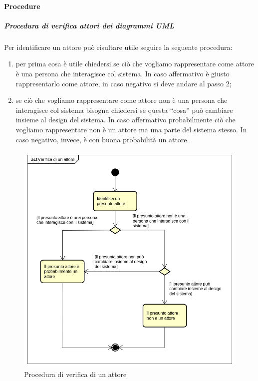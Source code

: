 \documentclass[../NormeProgetto.text]{subfiles}
\begin{document}
		\paragraph{Procedure}
		\subparagraph{Procedura di verifica attori dei diagrammi UML}\label{par:Procedura di verifica degli attori dei diagrammi UML}
			Per identificare un attore può risultare utile seguire la seguente procedura:
			\begin{enumerate}
				\item per prima cosa è utile chiedersi se ciò che vogliamo rappresentare come attore è una persona che interagisce col sistema. In caso affermativo è giusto rappresentarlo come attore, in caso negativo si deve andare al passo 2;
				\item se ciò che vogliamo rappresentare come attore non è una persona che interagisce col sistema bisogna chiedersi se questa ``cosa'' può cambiare insieme al design del sistema. In caso affermativo probabilmente ciò che vogliamo rappresentare non è un attore ma una parte del sistema stesso. In caso negativo, invece, è con buona probabilità un attore.
			\end{enumerate}
			\begin{figure}[H]
				\centering
				\includegraphics[scale=0.5, width=\textwidth]{sections/img/proceduraVerificaAttori.png}
				\caption{Procedura di verifica di un attore}\label{fig:Procedura di verifica di un attore} 
			\end{figure}
\end{document}
